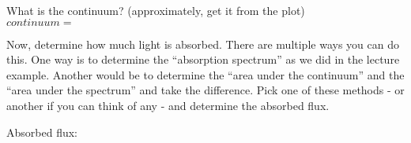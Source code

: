 \documentclass{article}
\begin{document}
\begin{spacing}{1.0}
What is the continuum?  (approximately, get it from the plot) \\
$continuum=$\underline{\hspace{3cm}}

Now, determine how much light is absorbed.  There are multiple ways you can do
this.  One way is to determine the ``absorption spectrum'' as we did in the
lecture example.  Another would be to determine the ``area under the continuum''
and the ``area under the spectrum'' and take the difference.  
Pick one of these methods - or another if you can think of any - and determine the
absorbed flux.

Absorbed flux: \underline{\hspace{3cm}}

\end{spacing}
\end{document}
